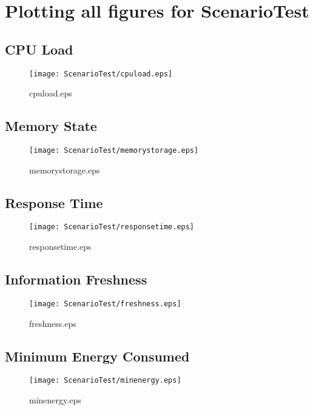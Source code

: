 \documentclass{elsart}
\begin{document}
\section{Plotting all figures for ScenarioTest}
\subsection{CPU Load}

\begin{figure}[ht]
\centering
\texttt{[image: ScenarioTest/cpuload.eps]}
\caption{cpuload.eps}\label{fig:cpuload}
\end{figure}

\clearpage
\subsection{Memory State}

\begin{figure}[ht]
\centering
\texttt{[image: ScenarioTest/memorystorage.eps]}
\caption{memorystorage.eps}\label{fig:memorystorage}
\end{figure}

\clearpage
\subsection{Response Time}

\begin{figure}[ht]
\centering
\texttt{[image: ScenarioTest/responsetime.eps]}
\caption{responsetime.eps}\label{fig:responsetime}
\end{figure}

\clearpage
\subsection{Information Freshness}

\begin{figure}[ht]
\centering
\texttt{[image: ScenarioTest/freshness.eps]}
\caption{freshness.eps}\label{fig:freshness}
\end{figure}

\clearpage
\subsection{Minimum Energy Consumed}

\begin{figure}[ht]
\centering
\texttt{[image: ScenarioTest/minenergy.eps]}
\caption{minenergy.eps}\label{fig:minenergy}
\end{figure}
\end{document}
